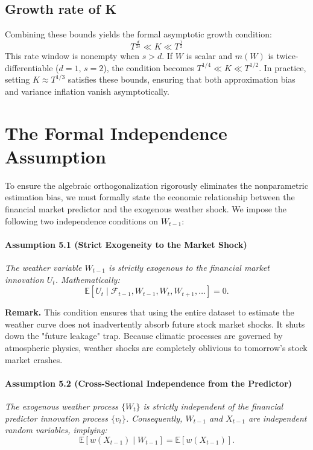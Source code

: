 \documentclass{article}
\begin{document}
\subsection{Growth rate of K}
Combining these bounds yields the formal asymptotic growth condition:
\begin{equation}
    T^{\frac{d}{2s}} \ll K \ll T^{\frac{1}{2}}
\end{equation}
This rate window is nonempty when $s>d$.
If $W$ is scalar and $m(W)$ is twice-differentiable ($d=1$, $s=2$), the condition becomes $T^{1/4} \ll K \ll T^{1/2}$. In practice, setting $K \approx T^{1/3}$ satisfies these bounds, ensuring that both approximation bias and variance inflation vanish asymptotically.

\section{The Formal Independence Assumption}

To ensure the algebraic orthogonalization rigorously eliminates the nonparametric estimation bias, we must formally state the economic relationship between the financial market predictor and the exogenous weather shock. We impose the following two independence conditions on $W_{t-1}$:

\paragraph*{Assumption 5.1 (Strict Exogeneity to the Market Shock)} \textit{The weather variable $W_{t-1}$ is strictly exogenous to the financial market innovation $U_t$. Mathematically:}
\begin{equation}
    \mathbb{E}[U_t \mid \mathcal{F}_{t-1}, W_{t-1}, W_t, W_{t+1}, \dots ] = 0.
\end{equation}

\noindent \textbf{Remark.} This condition ensures that using the entire dataset to estimate the weather curve does not inadvertently absorb future stock market shocks. It shuts down the "future leakage" trap. Because climatic processes are governed by atmospheric physics, weather shocks are completely oblivious to tomorrow's stock market crashes.

\paragraph*{Assumption 5.2 (Cross-Sectional Independence from the Predictor)} \textit{The exogenous weather process $\{W_t\}$ is strictly independent of the financial predictor innovation process $\{v_t\}$. Consequently, $W_{t-1}$ and $X_{t-1}$ are independent random variables, implying:}
\begin{equation}
    \mathbb{E}[w(X_{t-1}) \mid W_{t-1}] = \mathbb{E}[w(X_{t-1})].
\end{equation}
\end{document}
